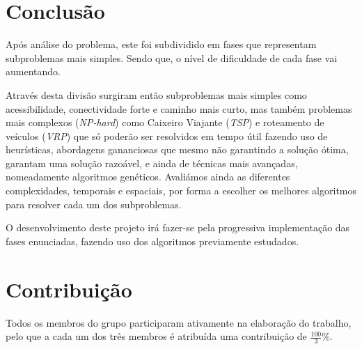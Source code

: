 \documentclass[12pt,a4paper]{report}
\begin{document}
\chapter{Conclusão}
Após análise do problema, este foi subdividido em fases que representam subproblemas mais simples. Sendo que, o nível de dificuldade de cada fase vai aumentando. \par
Através desta divisão surgiram então subproblemas mais simples como acessibilidade, conectividade forte e caminho mais curto, mas também problemas mais complexos (\textit{NP-hard}) como Caixeiro Viajante (\textit{TSP}) e roteamento de veículos (\textit{VRP}) que só poderão ser resolvidos em tempo útil fazendo uso de heurísticas, abordagens gananciosas que mesmo não garantindo a solução ótima, garantam uma solução razoável, e ainda de técnicas mais avançadas, nomeadamente algoritmos genéticos. Avaliámos ainda as diferentes complexidades, temporais e espaciais, por forma a escolher os melhores algoritmos para resolver cada um dos subproblemas. \par
O desenvolvimento deste projeto irá fazer-se pela progressiva implementação das fases enunciadas, fazendo uso dos algoritmos previamente estudados.


\chapter{Contribuição}
Todos os membros do grupo participaram ativamente na elaboração do trabalho, pelo que a cada um dos três membros é atribuída uma contribuição de \( \frac{100}{3} \% \).
\end{document}
